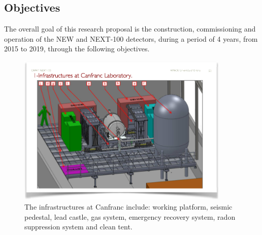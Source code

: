 \subsection*{Objectives}


The overall goal of this research proposal is the construction, commissioning and operation of the NEW and NEXT-100 detectors, during a period of 4 years, from 2015 to 2019, through the following objectives.  

\begin{figure}
\centering
\includegraphics[width=0.9\textwidth]{img/InfraStructures.png}
\caption{\small The infrastructures at Canfranc include: working platform, seismic pedestal, lead castle, gas system, emergency recovery system, radon suppression system and clean tent.}\label{fig.INFRA}
\end{figure}



